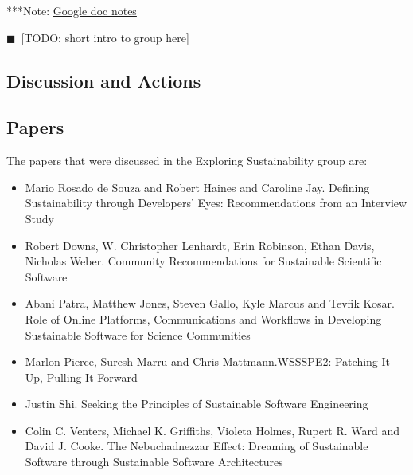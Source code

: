 \documentclass[11pt, oneside]{amsart}
\newcommand{\todo}[1]{{\color{blue}$\blacksquare$~\textsf{[TODO: #1]}}}
\newcommand{\note}[1]{ {\textcolor{blueish}    { ***Note:      #1 }}}
\begin{document}
\note{\href{http://tinyurl.com/mpbhvyb}{Google doc notes}}

\todo{short intro to group here}

\subsection{Discussion and Actions}

\subsection{Papers}
The papers that were discussed in the Exploring Sustainability group are:
\begin{itemize}
\item Mario {Rosado de Souza} and Robert Haines and Caroline Jay. Defining
Sustainability through Developers' Eyes: Recommendations from an Interview
Study~\cite{wssspe2_rosada_de_souza}

\item Robert Downs, W. Christopher Lenhardt, Erin Robinson, Ethan Davis,
Nicholas Weber. Community Recommendations for Sustainable Scientific
Software~\cite{wssspe2_downs}

\item Abani Patra, Matthew Jones, Steven Gallo, Kyle Marcus and Tevfik Kosar.
Role of Online Platforms, Communications and Workflows in Developing Sustainable
Software for Science Communities~\cite{wssspe2_patra}

\item Marlon Pierce, Suresh Marru and Chris Mattmann.{WSSSPE2}: Patching It Up,
Pulling It Forward~\cite{wssspe2_pierce}

\item Justin Shi. Seeking the Principles of Sustainable Software
Engineering~\cite{wssspe2_shi}

\item Colin C. Venters, Michael K. Griffiths, Violeta Holmes, Rupert R. Ward and
David J. Cooke. The Nebuchadnezzar Effect: Dreaming of Sustainable Software
through Sustainable Software Architectures~\cite{wssspe2_venters}
\end{itemize}
\end{document}

